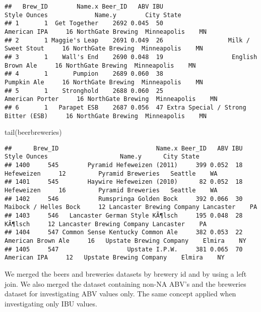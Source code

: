 \documentclass[
]{article}
\newenvironment{Shaded}{\begin{snugshade}}{\end{snugshade}}
\newcommand{\FunctionTok}[1]{\textcolor[rgb]{0.00,0.00,0.00}{#1}}
\newcommand{\NormalTok}[1]{#1}
\begin{document}
\begin{verbatim}
##   Brew_ID        Name.x Beer_ID   ABV IBU                               Style Ounces             Name.y        City State
## 1       1  Get Together    2692 0.045  50                        American IPA     16 NorthGate Brewing  Minneapolis    MN
## 2       1 Maggie's Leap    2691 0.049  26                  Milk / Sweet Stout     16 NorthGate Brewing  Minneapolis    MN
## 3       1    Wall's End    2690 0.048  19                   English Brown Ale     16 NorthGate Brewing  Minneapolis    MN
## 4       1       Pumpion    2689 0.060  38                         Pumpkin Ale     16 NorthGate Brewing  Minneapolis    MN
## 5       1    Stronghold    2688 0.060  25                     American Porter     16 NorthGate Brewing  Minneapolis    MN
## 6       1   Parapet ESB    2687 0.056  47 Extra Special / Strong Bitter (ESB)     16 NorthGate Brewing  Minneapolis    MN
\end{verbatim}

\begin{Shaded}
\begin{Highlighting}[]
\FunctionTok{tail}\NormalTok{(beerbreweries)}
\end{Highlighting}
\end{Shaded}

\begin{verbatim}
##      Brew_ID                           Name.x Beer_ID   ABV IBU                 Style Ounces                    Name.y      City State
## 1400     545        Pyramid Hefeweizen (2011)     399 0.052  18            Hefeweizen     12         Pyramid Breweries   Seattle    WA
## 1401     545        Haywire Hefeweizen (2010)      82 0.052  18            Hefeweizen     16         Pyramid Breweries   Seattle    WA
## 1402     546           Rumspringa Golden Bock     392 0.066  30 Maibock / Helles Bock     12 Lancaster Brewing Company Lancaster    PA
## 1403     546   Lancaster German Style KÃ¶lsch     195 0.048  28               KÃ¶lsch     12 Lancaster Brewing Company Lancaster    PA
## 1404     547 Common Sense Kentucky Common Ale     382 0.053  22    American Brown Ale     16   Upstate Brewing Company    Elmira    NY
## 1405     547                   Upstate I.P.W.     381 0.065  70          American IPA     12   Upstate Brewing Company    Elmira    NY
\end{verbatim}

We merged the beers and breweries datasets by brewery id and by using a
left join. We also merged the dataset containing non-NA ABV's and the
breweries dataset for investigating ABV values only. The same concept
applied when investigating only IBU values.
\end{document}
